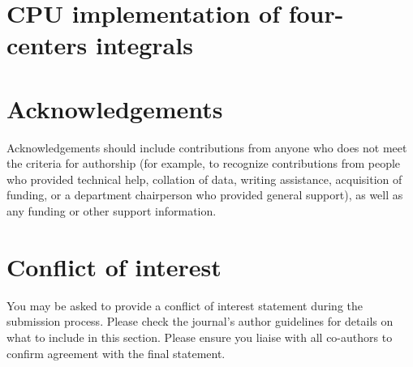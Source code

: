 \documentclass[num-refs]{wiley-article}
\begin{document}
% 
% 
% 
%

\section{CPU implementation of four-centers integrals}


\section*{Acknowledgements}
Acknowledgements should include contributions from anyone who does not meet the criteria for authorship (for example, to recognize contributions from people who provided technical help, collation of data, writing assistance, acquisition of funding, or a department chairperson who provided general support), as well as any funding or other support information.

\section*{Conflict of interest}
You may be asked to provide a conflict of interest statement during the submission process. Please check the journal's author guidelines for details on what to include in this section. Please ensure you liaise with all co-authors to confirm agreement with the final statement.


\end{document}
